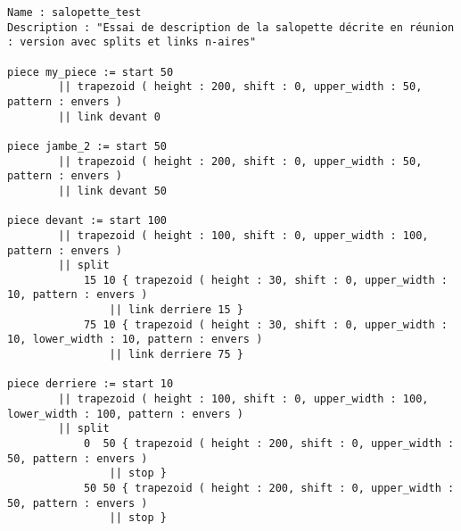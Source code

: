 \documentclass[a4paper,10pt]{article}
\begin{document}
\begin{lstlisting}
Name : salopette_test
Description : "Essai de description de la salopette décrite en réunion : version avec splits et links n-aires"

piece my_piece := start 50
		|| trapezoid ( height : 200, shift : 0, upper_width : 50, pattern : envers )
		|| link devant 0

piece jambe_2 := start 50
		|| trapezoid ( height : 200, shift : 0, upper_width : 50, pattern : envers )
		|| link devant 50

piece devant := start 100
		|| trapezoid ( height : 100, shift : 0, upper_width : 100, pattern : envers )
		|| split
			15 10 { trapezoid ( height : 30, shift : 0, upper_width : 10, pattern : envers )
				|| link derriere 15 }
			75 10 { trapezoid ( height : 30, shift : 0, upper_width : 10, lower_width : 10, pattern : envers )
				|| link derriere 75 }

piece derriere := start 10
		|| trapezoid ( height : 100, shift : 0, upper_width : 100, lower_width : 100, pattern : envers )
		|| split
			0  50 { trapezoid ( height : 200, shift : 0, upper_width : 50, pattern : envers )
				|| stop }
			50 50 { trapezoid ( height : 200, shift : 0, upper_width : 50, pattern : envers )
				|| stop }
\end{lstlisting}
\end{document}

